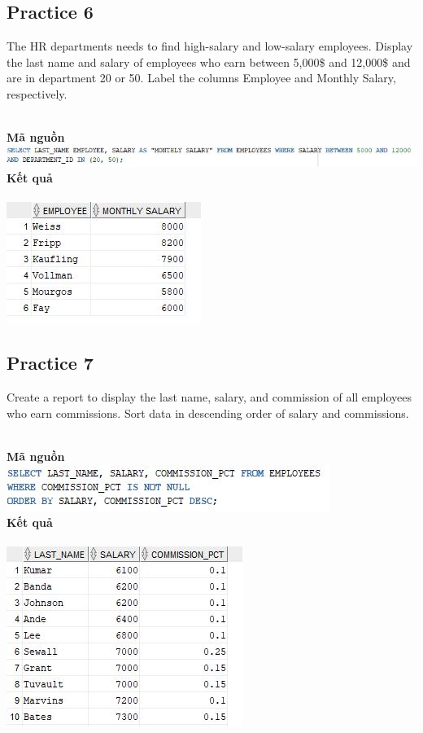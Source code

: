 \documentclass[12pt,a4paper]{report}
\begin{document}
\subsection{Practice 6}
\begin{boxedminipage}[t]{15.5cm}
	The HR departments needs to find high-salary and low-salary employees. 
	Display the last name and salary of employees who earn between 5,000\$ and 12,000\$ and are in department 20 or 50. Label the columns Employee and Monthly Salary, respectively.
\end{boxedminipage}
\newline
\\
\textbf{Mã nguồn}
\\
\newline
\includegraphics[scale=.8]{64.jpg}\\
\textbf{Kết quả}\\\\
\includegraphics[scale=1]{k64.jpg}

\subsection{Practice 7}
\begin{boxedminipage}[t]{15.5cm}
	Create a report to display the last name, salary, and commission of all employees who earn commissions. 
	Sort data in descending order of salary and commissions.
\end{boxedminipage}
\newline
\\
\textbf{Mã nguồn}
\\
\newline
\includegraphics[scale=1]{74.jpg}\\
\textbf{Kết quả}\\\\
\includegraphics[scale=1]{k74.jpg}
\end{document}
